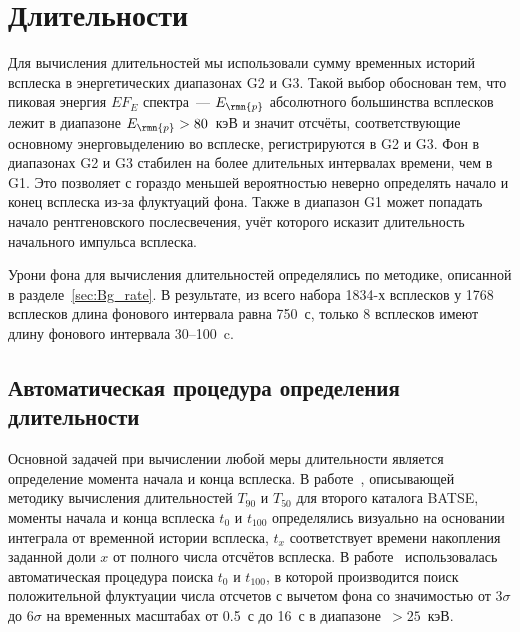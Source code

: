 \section{Длительности}\label{sec:Durations}
Для вычисления длительностей мы использовали сумму временных историй всплеска 
в энергетических диапазонах G2 и G3. Такой выбор обоснован тем, что  пиковая 
энергия $E F_{E}$ спектра~--- $E_{\rmn{p}}$ абсолютного большинства всплесков лежит в 
диапазоне $E_{\rmn{p}}>80$~кэВ и значит отсчёты, соответствующие  основному энерговыделению 
во всплеске, регистрируются в G2 и G3. Фон в диапазонах G2 и G3 стабилен на более 
длительных интервалах времени, чем в G1. Это позволяет с гораздо меньшей вероятностью 
неверно определять начало и конец всплеска из-за флуктуаций фона. Также в диапазон G1 
может попадать начало рентгеновского послесвечения, учёт которого исказит 
длительность начального импульса всплеска.

Урони фона для вычисления длительностей определялись по методике, описанной в 
разделе~\ref{sec:Bg_rate}. В результате, из всего набора 1834-х всплесков у 1768 всплесков длина 
фонового интервала равна 750~с, только 8 всплесков имеют длину фонового интервала 30--100~c.

\subsection{Автоматическая процедура определения длительности}
Основной задачей при вычислении любой меры длительности является определение момента 
начала и конца всплеска. В работе~\citep{Koshut_1996}, описывающей методику вычисления 
длительностей $T_{90}$ и $T_{50}$  для второго каталога BATSE, моменты начала и 
конца всплеска $t_{0}$ и $t_{100}$ определялись визуально на основании интеграла 
от временной истории всплеска, $t_{x}$ соответствует времени накопления заданной 
доли $x$ от полного числа отсчётов всплеска. В работе~\citep{Bonnell_1997} использовалась 
автоматическая процедура поиска $t_{0}$ и $t_{100}$, в которой производится поиск 
положительной флуктуации числа отсчетов с вычетом фона со значимостью от $3\sigma$ 
до $6\sigma$ на временных масштабах от 0.5~с до 16~с в диапазоне~$>25$~кэВ. 


